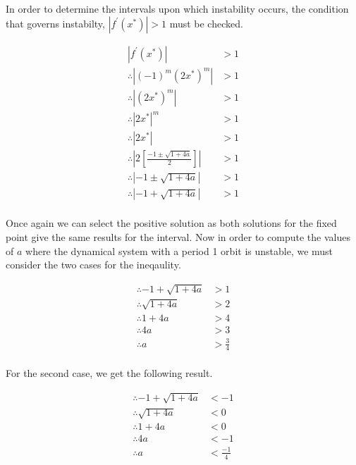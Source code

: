 \documentclass[a4paper]{article}
\begin{document}
\begin{enumerate}[label=\textbf{\arabic*.}]
\begin{enumerate}
		\pagebreak

		In order to determine the intervals upon which instability occurs, the condition that governs instabilty, $\displaystyle{\left|f^{\prime}(x^*) \right| > 1}$ must be checked.
		
		\begin{align*}
		\left|f^{\prime}(x^*) \right| & > 1\\
		\therefore \left|(-1)^m \left(2x^* \right)^m \right| & > 1\\
		\therefore \left|\left(2x^* \right)^m \right| & > 1\\
		\therefore \left|2x^* \right|^m & > 1\\
		\therefore \left|2x^* \right| & > 1\\
		\therefore \left|2\left[\frac{-1 \pm \sqrt{1+4a}}{2} \right] \right| & > 1\\
		\therefore \left|-1 \pm \sqrt{1+4a} \right| & > 1\\
		\therefore \left|-1 + \sqrt{1+4a} \right| & > 1\\
		\end{align*}

		Once again we can select the positive solution as both solutions for the fixed point give the same results for the interval. Now in order to compute the values of $a$ where the dynamical system with a period 1 orbit is unstable, we must consider the two cases for the ineqaulity.

		\begin{align*}
		\therefore -1 + \sqrt{1+4a} & > 1\\
		\therefore \sqrt{1+4a} & > 2\\
		\therefore 1 + 4a & > 4\\
		\therefore 4a & > 3\\
		\therefore a & > \frac{3}{4}\\
		\end{align*}

		For the second case, we get the following result.

		\begin{align*}
		\therefore -1 + \sqrt{1+4a} & < -1\\
		\therefore \sqrt{1+4a} & < 0\\
		\therefore 1 + 4a & < 0\\
		\therefore 4a & < -1\\
		\therefore a & < \frac{-1}{4}\\
		\end{align*}


\end{enumerate}
\end{enumerate}
\end{document}
